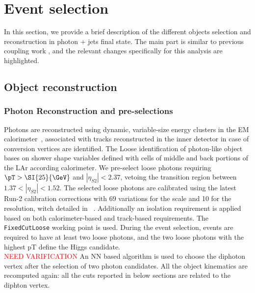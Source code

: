 \section{Event selection}
\label{sec:hgam_selection}

In this section, we provide a brief description of the different objects selection and reconstruction in photon + jets final state. The main part is similar to previous \Hyy coupling work \cite{ATLAS-CONF-2020-026}, and the relevant changes specifically for this analysis are highlighted. 

\subsection{Object reconstruction}
\label{ssec:obj_reconstruction}

\subsubsection{Photon Reconstruction and pre-selections}
Photons are reconstructed using dynamic, variable-size energy clusters in the EM calorimeter~\cite{ATL-PHYS-PUB-2017-022}, associated with tracks reconstructed in the inner detector in case of conversion vertices are identified. The Loose identification of photon-like object bases on shower shape variables defined with cells of middle and back portions of the LAr according calorimeter. We pre-select loose photons requiring $\pT>\SI{25}{\GeV}$ and $|\eta_{S2}|<2.37$, vetoing the transition region between $1.37 < |\eta_{S2}| < 1.52$. The selected loose photons are calibrated using the latest Run-2 calibration corrections with 69 variations for the scale and 10 for the resolution, witch detailed in ~\cite{Andari:2655306}. Additionally an isolation requirement is applied based on both calorimeter-based and track-based requirements. The \texttt{FixedCutLoose} working point is used. During the event selection, events are required to have at least two loose photons, and the two loose photons with the highest pT define the Higgs candidate.\\

\textcolor{red}{NEED VARIFICATION} An NN based algorithm is used to choose the diphoton vertex after the selection of two photon candidates. All the object kinematics are recomputed again: all the cuts reported in below sections are related to the diphton vertex.

